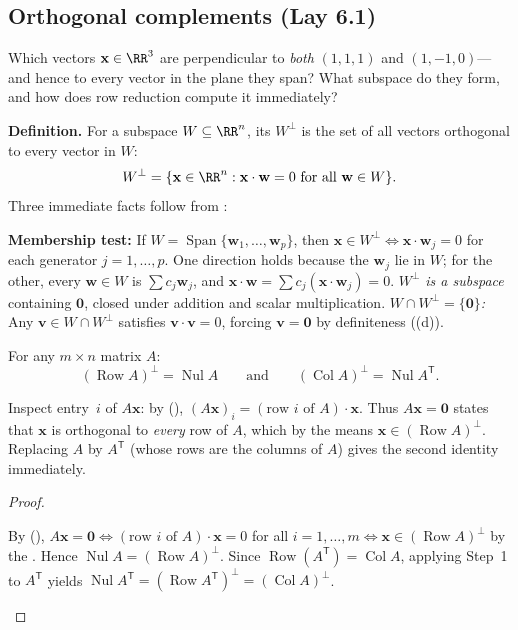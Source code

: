 \documentclass[10pt]{scrartcl}
\newcommand{\vv}[1]{\mathbf{#1}}
\DeclareMathOperator{\spn}{Span}\DeclareMathOperator{\Nul}{Nul}\DeclareMathOperator{\Col}{Col}\DeclareMathOperator{\Row}{Row}\DeclareMathOperator{\tr}{tr}\DeclareMathOperator{\proj}{proj}\DeclareMathOperator{\dist}{dist}
\begin{document}
\subsection{Orthogonal complements (Lay 6.1)}

\begin{qbox}
  Which vectors $\vv x\in\RR^3$ are perpendicular to \emph{both} $(1,1,1)$ and $(1,-1,0)$---and hence to every vector in the plane they span? What subspace do they form, and how does row reduction compute it immediately?
\end{qbox}

\noindent\textbf{Definition.} For a subspace $W\subseteq\RR^n$, its  $W^\perp$ is the set of all vectors orthogonal to every vector in $W$:
\[
  W^\perp = \{\vv x\in\RR^n : \vv x\cdot\vv w=0 \text{ for all }\vv w\in W\}.
\]
Three immediate facts follow from :
\begin{itemize}
  \ii {}\textbf{Membership test:} If $W=\spn\{\vv w_1,\dots,\vv w_p\}$, then $\vv x\in W^\perp \iff \vv x\cdot\vv w_j=0$ for each generator $j=1,\dots,p$. One direction holds because the $\vv w_j$ lie in $W$; for the other, every $\vv w\in W$ is $\sum c_j\vv w_j$, and $\vv x\cdot\vv w=\sum c_j(\vv x\cdot\vv w_j)=0$.
  \ii \emph{$W^\perp$ is a subspace} containing $\vv 0$, closed under addition and scalar multiplication.
  \ii \emph{$W\cap W^\perp=\{\vv 0\}$:} Any $\vv v\in W\cap W^\perp$ satisfies $\vv v\cdot\vv v=0$, forcing $\vv v=\vv 0$ by definiteness ((d)).
\end{itemize}

\begin{theorem*}
  For any $m\times n$ matrix $A$:
  \[
    (\Row A)^\perp = \Nul A \qquad\text{and}\qquad (\Col A)^\perp = \Nul A^{\mathsf T}.
  \]
\end{theorem*}
\begin{ideabox}
  Inspect entry~$i$ of $A\vv x$: by (), $(A\vv x)_i = (\text{row }i\text{ of }A)\cdot\vv x$. Thus $A\vv x=\vv 0$ states that $\vv x$ is orthogonal to \emph{every} row of $A$, which by the  means $\vv x\in(\Row A)^\perp$. Replacing $A$ by $A^{\mathsf T}$ (whose rows are the columns of $A$) gives the second identity immediately.
\end{ideabox}
\begin{proof}
  \begin{steps}
    \ii By (), $A\vv x=\vv 0 \iff (\text{row }i\text{ of }A)\cdot\vv x=0$ for all $i=1,\dots,m \iff \vv x\in(\Row A)^\perp$ by the . Hence $\Nul A=(\Row A)^\perp$.
    \ii Since $\Row(A^{\mathsf T})=\Col A$, applying Step~1 to $A^{\mathsf T}$ yields $\Nul A^{\mathsf T}=(\Row A^{\mathsf T})^\perp=(\Col A)^\perp$.
  \end{steps}
\end{proof}
\end{document}
